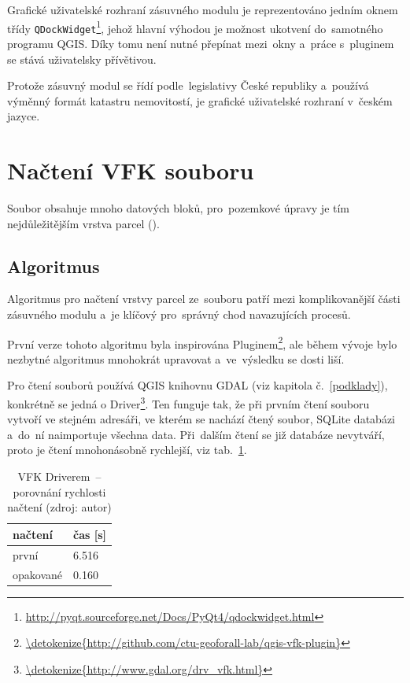Grafické uživatelské rozhraní zásuvného modulu je reprezentováno
jedním oknem třídy
\texttt{QDockWidget}\footnote{\url{http://pyqt.sourceforge.net/Docs/PyQt4/qdockwidget.html}},
jehož hlavní výhodou je možnost ukotvení do~samotného programu
QGIS. Díky tomu není nutné přepínat mezi~okny a~práce s~pluginem se
stává uživatelsky přívětivou.

Protože zásuvný modul se řídí podle~legislativy České republiky
a~používá výmě\-nný formát katastru nemovitostí, je grafické
uživatelské rozhraní v~českém jazyce.

\section{Načtení VFK souboru}
\label{nacteni_vfk}

Soubor  obsahuje mnoho datových bloků, pro~pozemkové úpravy je
tím nej\-důležitějším vrstva parcel (\texttt{}).

\subsection{Algoritmus}
\label{nacteni_vfk_algoritmus}

Algoritmus pro načtení vrstvy parcel ze~souboru  patří mezi
komplikovanější části zásuvného modulu a~je klíčový pro~správný chod
navazujících procesů.

První verze tohoto algoritmu byla inspirována 
Pluginem\footnote{\url{\detokenize{http://github.com/ctu-geoforall-lab/qgis-vfk-plugin}}},
ale během vývoje bylo nezbytné algoritmus mnohokrát upravovat
a~ve~výsledku se dosti liší.

Pro čtení  souborů používá QGIS knihovnu GDAL (viz kapitola
č.~\ref{podklady}), konkrétně se jedná o 
Driver\footnote{\url{\detokenize{http://www.gdal.org/drv_vfk.html}}}. Ten
funguje tak, že při prvním čtení souboru vytvoří ve stejném adresáři,
ve kterém se nachází čtený  soubor, SQLite databázi a~do~ní
naimportuje všechna data. Při~dalším čtení se již databáze nevytváří,
proto je čtení mnohonásobně rychlejší, viz
tab.~\ref{tab:nacteni_vfk_driver}.

\begin{table}[H]
    \begin{tabular}{|l|l|} \hline načtení & čas [s] \\ \hline \hline
první & 6.516 \\ \hline opakované & 0.160 \\ \hline
    \end{tabular} \centering
    \caption[VFK Driverem~– porovnání rychlosti načtení]{VFK
Driverem~– porovnání rychlosti načtení (zdroj: autor)}
    \label{tab:nacteni_vfk_driver}
\end{table}

